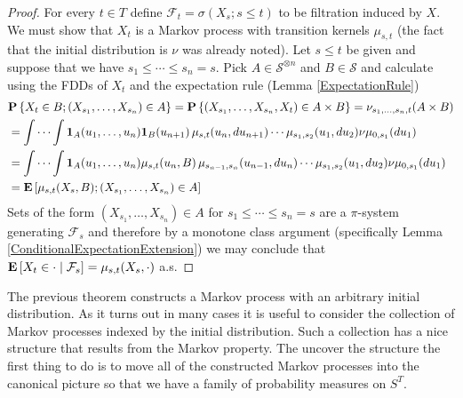 \begin{proof}
For every $t \in T$ define $\mathcal{F}_t = \sigma(X_s ; s \leq t)$ to
be filtration induced by $X$.  We must show that $X_t$ is a Markov process with transition
kernels $\mu_{s,t}$ (the fact that the initial distribution is $\nu$
was already noted).  Let $s \leq t$ be given and suppose that we have
$s_1 \leq \dotsb \leq s_n = s$.  Pick $A \in \mathcal{S}^{\otimes n}$
and $B \in \mathcal{S}$ and calculate using the FDDs of $X_t$ and the
expectation rule (Lemma \ref{ExpectationRule})
\begin{align*}
&\probability{ X_t \in B ; (X_{s_1}, \dotsc, X_{s_n}) \in A}  = \probability{(X_{s_1}, \dotsc, X_{s_n}, X_t) \in A \times B} =
\nu_{s_1, \dotsc, s_n, t}(A \times B) \\
&=\idotsint \characteristic{A}(u_1, \dotsc, u_n) \characteristic{B}(u_{n+1})\, 
\mu_{s,t}(u_{n}, du_{n+1})  \dotsb \mu_{s_1, s_2}(u_1, du_2)  \nu \mu_{0,s_1}(du_1) \\
&=\idotsint \characteristic{A}(u_1,\dotsc, u_n) \mu_{s,t}(u_{n}, B)\, 
\mu_{s_{n-1},s_n}(u_{n-1}, du_{n}) \dotsb \mu_{s_1, s_2}(u_1, du_2) \nu \mu_{0,s_1}(du_1) \\
&=\expectation{ \mu_{s,t}(X_s, B) ; (X_{s_1}, \dotsc, X_{s_n}) \in A }
\end{align*}
Sets of the form $(X_{s_1}, \dotsc, X_{s_n}) \in A$ for $s_1 \leq
\dotsb \leq s_n=s$ are a $\pi$-system generating $\mathcal{F}_s$ and
therefore by a monotone class argument (specifically Lemma \ref{ConditionalExpectationExtension}) we may
conclude that $\cexpectationlong{\mathcal{F}_s}{X_t \in \cdot} =
\mu_{s,t}(X_s, \cdot)$ a.s.
\end{proof}

The previous theorem constructs a Markov process with an arbitrary initial distribution.  As it turns out in many cases
it is useful to consider the collection of Markov processes indexed by the initial distribution.  Such a collection has a
nice structure that results from the Markov property.  The uncover the structure the first thing to do is to move all of the 
constructed Markov processes into the canonical picture so that we have a family of probability measures on $S^T$.

